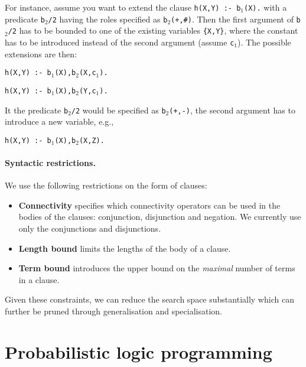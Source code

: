 For instance, assume you want to extend the clause \texttt{h(X,Y) :- b$_1$(X).} with a predicate \texttt{b$_2$/2} having the roles specified as \texttt{b$_2$(+,\#)}.
Then the first argument of \texttt{b$_2$/2} has to be bounded to one of the existing variables \texttt{\{X,Y\}}, where the constant has to be introduced instead of the second argument (assume \texttt{c$_1$}).
The possible extensions are then:
\begin{center}
	\texttt{h(X,Y) :- b$_1$(X),b$_2$(X,c$_1$).}


	\texttt{h(X,Y) :- b$_1$(X),b$_2$(Y,c$_1$).}
\end{center}

It the predicate \texttt{b$_2$/2} would be specified as \texttt{b$_2$(+,-)}, the second argument has to introduce a new variable, e.g.,
\begin{center}
	\texttt{h(X,Y) :- b$_1$(X),b$_2$(X,Z).}
\end{center}


\paragraph{Syntactic restrictions.}
We use the following restrictions on the form of clauses:
\begin{itemize}
	\item \textbf{Connectivity} specifies which connectivity operators can be used in the bodies of the clauses: conjunction, disjunction and negation. We currently use only the conjunctions and disjunctions.
	\item \textbf{Length bound} limits the lengths of the body of a clause.
	\item \textbf{Term bound} introduces the upper bound on the \textit{maximal} number of terms in a clause.
\end{itemize}

Given these constraints, we can reduce the search space substantially which can further be pruned through generalisation and specialisation.









\section{Probabilistic logic programming}



